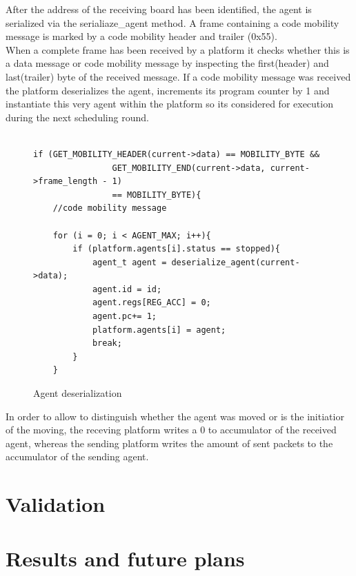\documentclass{scrreprt}
\begin{document}
After the address of the receiving board has been identified, the agent is serialized via the serialiaze_agent method. 
A frame containing a code mobility message is marked by a code mobility header and trailer (0x55).\\

\noindent
When a complete frame has been received by a platform it checks whether this is a data message or code mobility message
by inspecting the first(header) and last(trailer) byte of the received message. If a code mobility message was received
the platform deserializes the agent, increments its program counter by 1 and instantiate this very agent within the platform
so its considered for execution during the next scheduling round. \\

\begin{figure}[!htb]
\lstset{language=C, tabsize=2}
\begin{lstlisting}[frame=single]
	
if (GET_MOBILITY_HEADER(current->data) == MOBILITY_BYTE && 
				GET_MOBILITY_END(current->data, current->frame_length - 1)
				== MOBILITY_BYTE){
	//code mobility message

	for (i = 0; i < AGENT_MAX; i++){
		if (platform.agents[i].status == stopped){
			agent_t agent = deserialize_agent(current->data);
			agent.id = id;
			agent.regs[REG_ACC] = 0;
			agent.pc+= 1;
			platform.agents[i] = agent;
			break;
		}
	}

\end{lstlisting}
\caption{Agent deserialization}
\label{fig:agent-des}
\end{figure}


\noindent
In order to allow to distinguish whether the agent 
was moved or is the initiatior of the moving, the receving platform writes a 0 to accumulator of the received agent,
whereas the sending platform writes the amount of sent packets to the accumulator of the sending agent. 


\chapter{Validation}

\chapter{Results and future plans}




\end{document}
